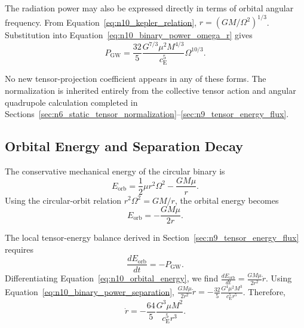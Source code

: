 The radiation power may also be expressed directly in terms of orbital angular frequency. From Equation~\eqref{eq:n10_kepler_relation}, $r = \left( GM/\Omega^{2} \right)^{1/3}$. Substitution into Equation~\eqref{eq:n10_binary_power_omega_r} gives
\begin{equation}
    P_{\mathrm{GW}} = \frac{32}{5} \frac{ G^{7/3} \mu^{2} M^{4/3} }{ c_{\mathrm{E}}^{5} } \Omega^{10/3}.
    \label{eq:n10_binary_power_frequency_prechirp}
\end{equation}

No new tensor-projection coefficient appears in any of these forms. The normalization is inherited entirely from the collective tensor action and angular quadrupole calculation completed in Sections~\ref{sec:n6_static_tensor_normalization}--\ref{sec:n9_tensor_energy_flux}.

\subsection{Orbital Energy and Separation Decay}
\label{subsec:n10_orbital_decay}

The conservative mechanical energy of the circular binary is
\begin{equation}
    E_{\mathrm{orb}} = \frac{1}{2} \mu r^{2}\Omega^{2} - \frac{GM\mu}{r}.
    \label{eq:n10_orbital_energy_initial}
\end{equation}
Using the circular-orbit relation $r^{2}\Omega^{2} = GM/r$, the orbital energy becomes
\begin{equation}
    E_{\mathrm{orb}} = - \frac{ GM\mu }{ 2r }.
    \label{eq:n10_orbital_energy}
\end{equation}

The local tensor-energy balance derived in Section~\ref{sec:n9_tensor_energy_flux} requires
\begin{equation}
    \frac{dE_{\mathrm{orb}}}{dt} = - P_{\mathrm{GW}}.
    \label{eq:n10_energy_balance}
\end{equation}
Differentiating Equation~\eqref{eq:n10_orbital_energy}, we find $\frac{dE_{\mathrm{orb}}}{dt} = \frac{ GM\mu }{ 2r^{2} } \dot{r}$. Using Equation~\eqref{eq:n10_binary_power_separation}, $\frac{ GM\mu }{ 2r^{2} } \dot{r} = - \frac{32}{5} \frac{ G^{4}\mu^{2}M^{3} }{ c_{\mathrm{E}}^{5}r^{5} }$. Therefore,
\begin{equation}
    \dot{r} = - \frac{64}{5} \frac{ G^{3}\mu M^{2} }{ c_{\mathrm{E}}^{5}r^{3} }.
    \label{eq:n10_separation_decay}
\end{equation}

